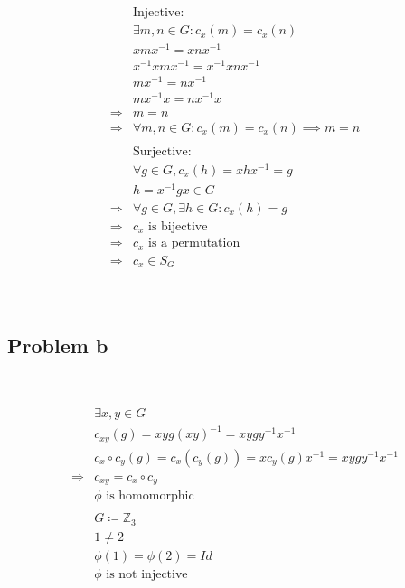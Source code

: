 \documentclass{article}
\begin{document}
\begin{equation*}
    \begin{split}
        &\text{Injective}:\\
        &\exists m,n\in G:c_x(m)=c_x(n)\\
        &xmx^{-1}=xnx^{-1}\\
        &x^{-1}xmx^{-1}=x^{-1}xnx^{-1}\\
        &mx^{-1}=nx^{-1}\\
        &mx^{-1}x=nx^{-1}x\\
        \Rightarrow&m=n\\
        \Rightarrow&\forall m,n\in G:c_x(m)=c_x(n)\implies m=n\\
        &\\
        &\text{Surjective}:\\
        &\forall g\in G,c_x(h)=xhx^{-1}=g\\
        &h=x^{-1}gx\in G\\
        \Rightarrow&\forall g\in G,\exists h\in G:c_x(h)=g\\
        \Rightarrow&c_x\text{ is bijective}\\
        \Rightarrow&c_x\text{ is a permutation}\\
        \Rightarrow&c_x\in S_G\\
    \end{split}
\end{equation*}

~

\subsection*{Problem b}

~

\begin{equation*}
    \begin{split}
        &\exists x,y\in G\\
        &c_{xy}(g)=xyg(xy)^{-1}=xygy^{-1}x^{-1}\\
        &c_x\circ c_y(g)=c_x(c_y(g))=xc_y(g)x^{-1}=xygy^{-1}x^{-1}\\
        \Rightarrow&c_{xy}=c_x\circ c_y\\
        &\phi\text{ is homomorphic}\\
        &\\
        &G\coloneqq \mathbb{Z} _3\\
        &1\ne2\\
        &\phi(1)=\phi(2)=Id\\
        &\phi\text{ is not injective}\\
    \end{split}
\end{equation*}
\end{document}

